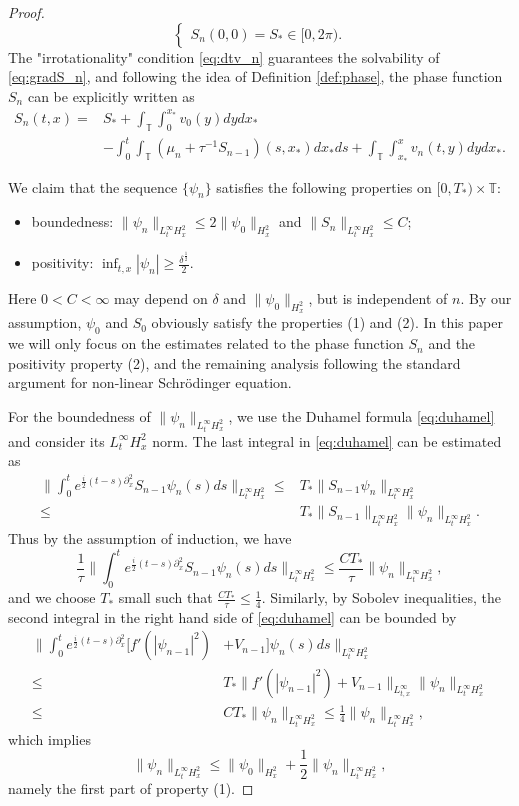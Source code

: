 \documentclass[10pt,a4paper]{amsart}
\def\T{{\mathbb T}}%
\def\d{{\partial}}
\begin{document}
\begin{proof}
\begin{equation}
\begin{cases}
S_n(0,0)=S_*\in [0,2\pi).
\end{cases}
\end{equation}
The "irrotationality" condition \eqref{eq:dtv_n} guarantees the solvability of \eqref{eq:gradS_n}, and following the idea of Definition \ref{def:phase}, the phase function $S_n$ can be explicitly written as
\begin{equation}\label{eq:defS_n}
\begin{aligned}
S_n(t,x)=&S_*+\int_\T\int_0^{x_*}v_0(y)dydx_*\\
&-\int_0^t \int_\T(\mu_n+\tau^{-1}S_{n-1})(s,x_*)dx_*ds+\int_\T\int_{x_*}^x v_n(t,y)dydx_*.
\end{aligned}
\end{equation}

We claim that the sequence $\{\psi_n\}$ satisfies the following properties on $[0,T_*)\times \T$:
\begin{itemize}
\item[(1)] boundedness: $\|\psi_n\|_{L^\infty_tH^2_x}\leq 2\|\psi_0\|_{H^2_x}$ and $\|S_{n}\|_{L^\infty_tH^2_x}\leq C$;
\item[(2)] positivity: $\inf_{t,x}|\psi_n|\geq \frac{\delta^\frac12}{2}$.
\end{itemize}
Here $0<C<\infty$ may depend on $\delta$ and $\|\psi_0\|_{H^2_x}$, but is independent of $n$. By our assumption, $\psi_0$ and $S_0$ obviously satisfy the properties (1) and (2). In this paper we will only focus on the estimates related to the phase function $S_n$ and the positivity property (2), and the remaining analysis following the standard argument for non-linear Schr\"odinger equation.

For the boundedness of $\|\psi_n\|_{L^\infty_tH^2_x}$, we use the Duhamel formula \eqref{eq:duhamel} and consider its $L^\infty_tH^2_x$ norm. The last integral in \eqref{eq:duhamel} can be estimated as
\begin{align*}
\|\int_0^te^{\frac{i}{2}(t-s)\d_x^2}S_{n-1}\psi_n(s)ds\|_{L^\infty_tH^2_x}\leq&  T_* \|S_{n-1}\psi_n \|_{L^\infty_tH^2_x}\\
\leq & T_* \|S_{n-1}\|_{L^\infty_tH^2_x}\|\psi_n \|_{L^\infty_tH^2_x}.
\end{align*}
Thus by the assumption of induction, we have
\[
\frac{1}{\tau}\|\int_0^te^{\frac{i}{2}(t-s)\d_x^2}S_{n-1}\psi_n(s)ds\|_{L^\infty_tH^2_x}\leq \frac{CT_*}{\tau} \|\psi_n \|_{L^\infty_tH^2_x},
\]
and we choose $T_*$ small such that $\frac{CT_*}{\tau}\leq \frac14$. Similarly, by Sobolev inequalities, the second integral in the right hand side of \eqref{eq:duhamel} can be bounded by
\begin{align*}
\|\int_0^te^{\frac{i}{2}(t-s)\d_x^2}[f'(|\psi_{n-1}|^2)&+V_{n-1}]\psi_n(s)ds\|_{L^\infty_tH^2_x}\\
\leq & T_*\|f'(|\psi_{n-1}|^2)+V_{n-1}\|_{L^\infty_{t,x}}\|\psi_n\|_{L_t^\infty H^2_x}\\
\leq & CT_*\|\psi_n\|_{L_t^\infty H^2_x}\leq \frac14\|\psi_n\|_{L_t^\infty H^2_x},
\end{align*}
which implies
\[
\|\psi_n\|_{L_t^\infty H^2_x}\leq \|\psi_0\|_{H^2_x}+\frac12\|\psi_n\|_{L_t^\infty H^2_x},
\]
namely the first part of property (1). 


\end{proof}
\end{document}
